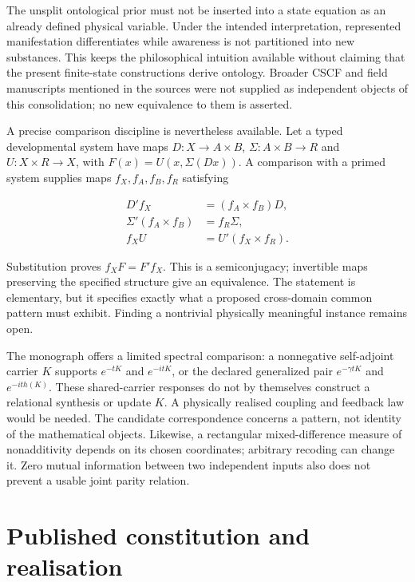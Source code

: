 \documentclass[
  11pt,
  a4paper,
]{article}
\begin{document}
The unsplit ontological prior must not be inserted into a state equation
as an already defined physical variable. Under the intended
interpretation, represented manifestation differentiates while awareness
is not partitioned into new substances. This keeps the philosophical
intuition available without claiming that the present finite-state
constructions derive ontology. Broader CSCF and field manuscripts
mentioned in the sources were not supplied as independent objects of
this consolidation; no new equivalence to them is asserted.

A precise comparison discipline is nevertheless available. Let a typed
developmental system have maps \(D:X\to A\times B\),
\(\Sigma:A\times B\to R\) and \(U:X\times R\to X\), with
\(F(x)=U(x,\Sigma(Dx))\). A comparison with a primed system supplies
maps \(f_X,f_A,f_B,f_R\) satisfying

\[
\begin{aligned}
D'f_X&=(f_A\times f_B)D,\\
\Sigma'(f_A\times f_B)&=f_R\Sigma,\\
f_XU&=U'(f_X\times f_R).
\end{aligned}
\]

Substitution proves \(f_XF=F'f_X\). This is a semiconjugacy; invertible
maps preserving the specified structure give an equivalence. The
statement is elementary, but it specifies exactly what a proposed
cross-domain common pattern must exhibit. Finding a nontrivial
physically meaningful instance remains open.

The monograph offers a limited spectral comparison: a nonnegative
self-adjoint carrier \(K\) supports \(e^{-tK}\) and \(e^{-itK}\), or the
declared generalized pair \(e^{-\gamma tK}\) and \(e^{-it h(K)}\). These
shared-carrier responses do not by themselves construct a relational
synthesis or update \(K\). A physically realised coupling and feedback
law would be needed. The candidate correspondence concerns a pattern,
not identity of the mathematical objects. Likewise, a rectangular
mixed-difference measure of nonadditivity depends on its chosen
coordinates; arbitrary recoding can change it. Zero mutual information
between two independent inputs also does not prevent a usable joint
parity relation.

\section{Published constitution and
realisation}\label{published-constitution-and-realization}
\end{document}
